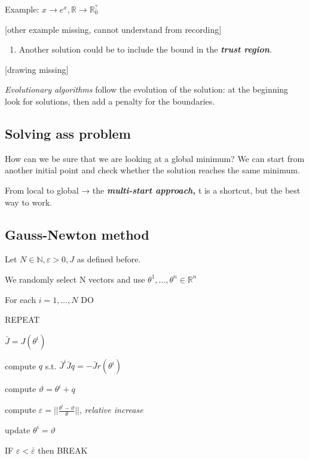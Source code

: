 Example: $x \rightarrow e^x, \mathbb{R} \rightarrow \mathbb{R}_0^?$

{[}other example missing, cannot understand from recording{]}

\begin{enumerate}
\def\labelenumi{\arabic{enumi}.}
\tightlist
\item
  Another solution could be to include the bound in the
  \textbf{\emph{trust region}}.
\end{enumerate}

{[}drawing missing{]}

\emph{Evolutionary algorithms} follow the evolution of the solution: at
the beginning look for solutions, then add a penalty for the boundaries.

\hypertarget{solving-ass-problem}{%
\subsection{Solving ass problem}\label{solving-ass-problem}}

How can we be sure that we are looking at a global minimum? We can start
from another initial point and check whether the solution reaches the
same minimum.

From local to global → the \textbf{\emph{multi-start approach,}} t is a
shortcut, but the best way to work.

\hypertarget{gauss-newton-method}{%
\subsection{Gauss-Newton method}\label{gauss-newton-method}}

Let $N \in \mathbb{N}, \varepsilon > 0, J$ as defined before.

We randomly select N vectors and use
$\theta^1, \dots, \theta^n \in \mathbb{R}^n$

For each $i=1,\dots,N$ DO

REPEAT

$\bar{J}=J(\theta^i)$

compute $q$ s.t. $\bar{J}^i\bar{J}q=-\bar{J}r(\theta^i)$

compute $\vartheta = \theta^i + q$

compute $\varepsilon = ||\frac{\theta^i-\vartheta}{\theta}||$,
\emph{relative increase}

update $\theta^i = \vartheta$

IF $\varepsilon<\bar{\varepsilon}$ then BREAK

